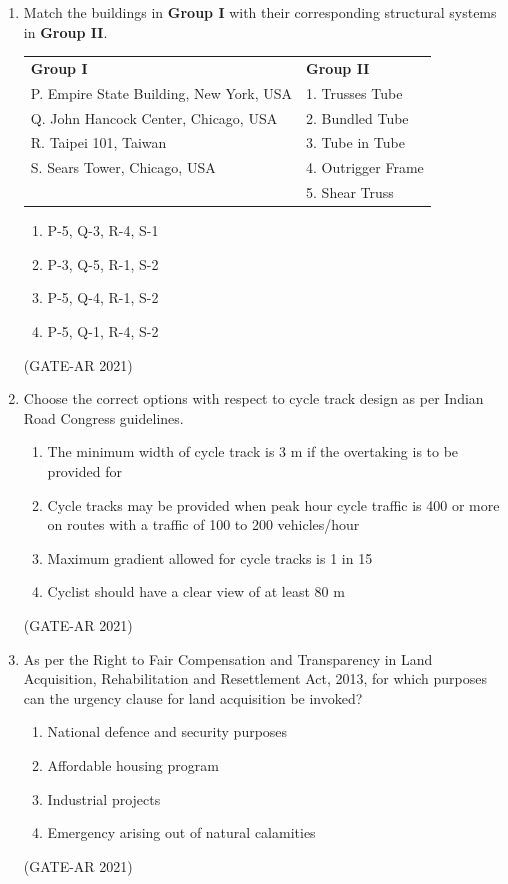 \documentclass[a4paper,10pt]{article}
\begin{document}
\begin{enumerate}
    \item Match the buildings in \textbf{Group I} with their corresponding structural systems in \textbf{Group II}. \\
    \begin{tabular}{ l l }
    \textbf{Group I} & \textbf{Group II} \\
    P. Empire State Building, New York, USA & 1. Trusses Tube \\
    Q. John Hancock Center, Chicago, USA & 2. Bundled Tube \\
    R. Taipei 101, Taiwan & 3. Tube in Tube \\
    S. Sears Tower, Chicago, USA & 4. Outrigger Frame \\
    & 5. Shear Truss \\
    \end{tabular}
    \begin{multicols}{2}
    \begin{enumerate}
        \item P-5, Q-3, R-4, S-1
        \item P-3, Q-5, R-1, S-2
        \item P-5, Q-4, R-1, S-2
        \item P-5, Q-1, R-4, S-2
    \end{enumerate}
    \end{multicols}
    \hfill (GATE-AR 2021)
    
    \item Choose the correct options with respect to cycle track design as per Indian Road Congress guidelines.
    \begin{enumerate}
    \item The minimum width of cycle track is 3 m if the overtaking is to be provided for
    \item Cycle tracks may be provided when peak hour cycle traffic is 400 or more on routes with a traffic of 100 to 200 vehicles/hour
    \item Maximum gradient allowed for cycle tracks is 1 in 15
    \item Cyclist should have a clear view of at least 80 m
    \end{enumerate}
    \hfill (GATE-AR 2021)
    
    \item As per the Right to Fair Compensation and Transparency in Land Acquisition, Rehabilitation and Resettlement Act, 2013, for which purposes can the urgency clause for land acquisition be invoked?
    \begin{enumerate}
    \item National defence and security purposes
    \item Affordable housing program
    \item Industrial projects
    \item Emergency arising out of natural calamities
    \end{enumerate}
    \hfill (GATE-AR 2021)


\end{enumerate}
\end{document}
